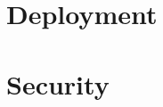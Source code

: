 \documentclass[a4paper]{article}
\begin{document}


\newpage
\tableofcontents
\todototoc
\listoftodos
\newpage



\section{Deployment}%
\label{sec:deployment}

\section{Security}%
\label{sec:security}



\end{document}
